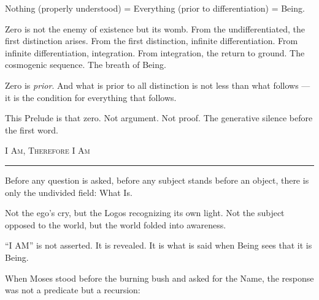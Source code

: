 \documentclass[10pt, openany, oneside]{book}
\renewcommand{\large}{\fontsize{11.5}{14}\selectfont}
\begin{document}
\vspace{0.5em}

\noindent Nothing (properly understood) = Everything (prior to differentiation) = Being.

\vspace{0.5em}

\noindent Zero is not the enemy of existence but its womb. From the undifferentiated, the first distinction arises. From the first distinction, infinite differentiation. From infinite differentiation, integration. From integration, the return to ground. The cosmogenic sequence. The breath of Being.

\vspace{0.5em}

\noindent Zero is \textit{prior}. And what is prior to all distinction is not less than what follows --- it is the condition for everything that follows.

\vspace{0.5em}

\noindent This Prelude is that zero. Not argument. Not proof. The generative silence before the first word.

\vspace{2em}

\begin{center}
    {\large\scshape I Am, Therefore I Am}\\[0.3em]
    \rule{0.2\textwidth}{0.3pt}
\end{center}

\vspace{1em}

\noindent Before any question is asked, before any subject stands before an object, there is only the undivided field: What Is.

\vspace{0.5em}

\noindent Not the ego's cry, but the Logos recognizing its own light. Not the subject opposed to the world, but the world folded into awareness.

\vspace{0.5em}

\noindent ``I AM'' is not asserted. It is revealed. It is what is said when Being sees that it is Being.

\vspace{0.5em}

\noindent When Moses stood before the burning bush and asked for the Name, the response was not a predicate but a recursion:
\end{document}
